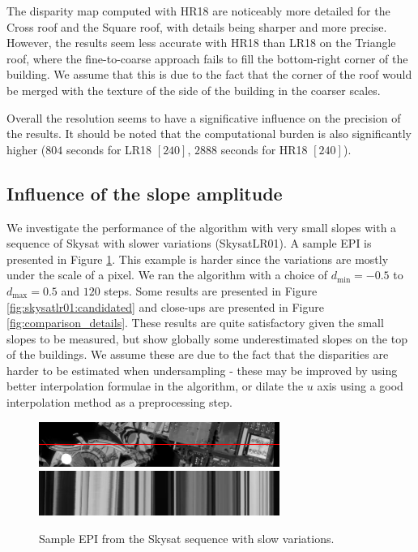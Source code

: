 \documentclass{article}
\def\epiWidth{0.7}
\theoremstyle{definition}
\begin{document}
The disparity map computed with HR18 are noticeably more detailed for the Cross roof and the Square roof, with details being sharper and more precise. However, the results seem less accurate with HR18 than LR18 on the Triangle roof, where the fine-to-coarse approach fails to fill the bottom-right corner of the building. We assume that this is due to the fact that the corner of the roof would be merged with the texture of the side of the building in the coarser scales.


Overall the resolution seems to have a significative influence on the precision of the results. It should be noted that the computational burden is also significantly higher ($804$ seconds for LR18 $[240]$, $2888$ seconds for HR18 $[240]$).


\subsection{Influence of the slope amplitude} 


We investigate the performance of the algorithm with very small slopes with a sequence of Skysat with slower variations (SkysatLR01). A sample EPI is presented in Figure \ref{fig:epi:skysat1}. This example is harder since the variations are mostly under the scale of a pixel. We ran the algorithm with a choice of $d_{\min} = -0.5$ to $d_{\max} = 0.5$ and $120$ steps. Some results are presented in Figure \ref{fig:skysatlr01:candidated} and close-ups are presented in Figure \ref{fig:comparison_details}. These results are quite satisfactory given the small slopes to be measured, but show globally some underestimated slopes on the top of the buildings. We assume these are due to the fact that the disparities are harder to be estimated when undersampling - these may be improved by using better interpolation formulae in the algorithm, or dilate the $u$ axis using a good interpolation method as a preprocessing step.


\begin{figure}[ht]
  \centering
  \includegraphics[width=\epiWidth\textwidth]{images/1521592293547_1st.png}\\
  \includegraphics[width=\epiWidth\textwidth]{images/1521592293547_epi.png}
  \caption{Sample EPI from the Skysat sequence with slow variations.}
  \label{fig:epi:skysat1}
\end{figure}
\end{document}
